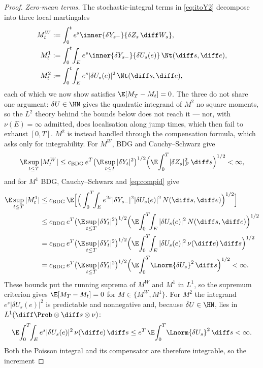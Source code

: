 \begin{proof}
\emph{Zero-mean terms.} The stochastic-integral terms in \eqref{eq:itoY2} decompose into three
local martingales
\[
\begin{aligned}
M^W_t&:=\int_0^t e^{s}\inner{\delta Y_{s-}}{\delta Z_s\,\diff W_s},\\
M^1_t&:=\int_0^t\!\int_E e^{s}\inner{\delta Y_{s-}}{\delta U_s(e)}\,\Nt(\diff s,\diff e),\\
M^2_t&:=\int_0^t\!\int_E e^{s}|\delta U_s(e)|^2\,\Nt(\diff s,\diff e),
\end{aligned}
\]
each of which we now show satisfies $\E[M_T-M_t]=0$. The three do not share one argument:
$\delta U\in\HN$ gives the quadratic integrand of $M^2$ no square moments, so the $L^2$
theory behind the bounds below does not reach it --- nor, with $\nu(E)=\infty$ admitted,
does localisation along jump times, which then fail to exhaust $[0,T]$. $M^2$ is instead
handled through the compensation formula, which asks only for integrability.
For $M^W$, BDG and Cauchy--Schwarz give
\[
\E\sup_{t\le T}|M^W_t|
\le c_{\mathrm{BDG}}\,e^{T}\big(\E\sup_{t\le T}|\delta Y_t|^2\big)^{1/2}
\Big(\E\!\int_0^T\!|\delta Z_s|_F^2\,\diff s\Big)^{1/2}<\infty ,
\]
and for $M^1$ BDG, Cauchy--Schwarz and \eqref{eq:compid} give
\begin{align*}
\E\sup_{t\le T}|M^1_t|
&\le c_{\mathrm{BDG}}\,\E\Big[\Big(\int_0^T\!\!\int_E e^{2s}|\delta Y_{s-}|^2|\delta U_s(e)|^2
\,N(\diff s,\diff e)\Big)^{1/2}\Big]\\
&\le c_{\mathrm{BDG}}\,e^{T}\big(\E\sup_{t\le T}|\delta Y_t|^2\big)^{1/2}
\Big(\E\!\int_0^T\!\!\int_E|\delta U_s(e)|^2\,N(\diff s,\diff e)\Big)^{1/2}\\
&=c_{\mathrm{BDG}}\,e^{T}\big(\E\sup_{t\le T}|\delta Y_t|^2\big)^{1/2}
\Big(\E\!\int_0^T\!\!\int_E|\delta U_s(e)|^2\,\nu(\diff e)\,\diff s\Big)^{1/2}\\
&=c_{\mathrm{BDG}}\,e^{T}\big(\E\sup_{t\le T}|\delta Y_t|^2\big)^{1/2}
\Big(\E\!\int_0^T\!\Lnorm{\delta U_s}^2\,\diff s\Big)^{1/2}<\infty .
\end{align*}
These bounds put the running suprema of $M^W$ and $M^1$ in $L^1$, so the supremum
criterion gives $\E[M_T-M_t]=0$ for $M\in\{M^W,M^1\}$.
For $M^2$ the integrand $e^{s}|\delta U_s(e)|^2$ is predictable and nonnegative and,
because $\delta U\in\HN$, lies in $L^1(\diff\Prob\otimes\diff s\otimes\nu)$:
\[
\E\!\int_0^T\!\!\int_E e^{s}|\delta U_s(e)|^2\,\nu(\diff e)\,\diff s
\le e^{T}\,\E\!\int_0^T\!\Lnorm{\delta U_s}^2\,\diff s<\infty .
\]
Both the Poisson integral and its compensator are therefore integrable, so the increment

\end{proof}
